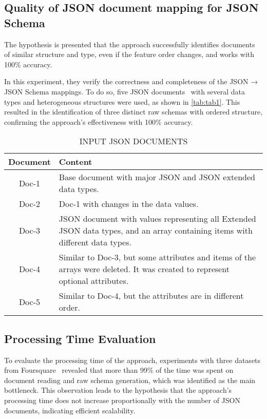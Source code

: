 \documentclass[sigconf, nonacm]{acmart}
\begin{document}
\subsection{Quality of JSON document mapping for JSON Schema}
The hypothesis is presented that the approach successfully identifies documents of similar structure and type, even if the feature order changes, and works with 100\% accuracy.

 In this experiment, they verify the correctness and completeness of the JSON → JSON Schema mappings. To do so, five JSON documents~\cite{JsonDataDocs} with several data types and heterogeneous structures were used, as shown in \autoref{tab:tab1}. This resulted in the identification of three distinct raw schemas with ordered structure, confirming the approach's effectiveness with 100\% accuracy.
 
\begin{table}
  \caption{INPUT JSON DOCUMENTS}
  \label{tab:tab1}
  \begin{tabular}{|c|p{6cm}|} 
    \hline 
    Document & Content \\
    \hline 
    Doc-1 & Base document with major JSON and JSON extended data types. \\
    \hline 
    Doc-2 & Doc-1 with changes in the data values. \\
    \hline
    Doc-3 & JSON document with values representing all Extended JSON data types, and an array containing items with different data types. \\
    \hline
    Doc-4 & Similar to Doc-3, but some attributes and items of the arrays were deleted. It was created to represent optional attributes. \\
    \hline
    Doc-5 & Similar to Doc-4, but the attributes are in different order. \\
    \hline 
  \end{tabular}
\end{table}

\subsection{Processing Time Evaluation}
To evaluate the processing time of the approach, experiments with three datasets from Foursquare~\cite{su11030595} revealed that more than 99\% of the time was spent on document reading and raw schema generation, which was identified as the main bottleneck. This observation leads to the hypothesis that the approach's processing time does not increase proportionally with the number of JSON documents, indicating efficient scalability.
\end{document}
